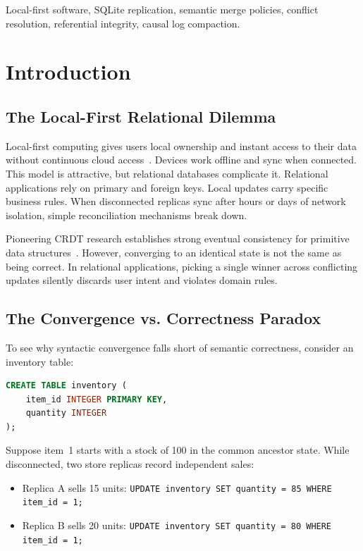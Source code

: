 \documentclass[conference]{IEEEtran}
\begin{document}
\begin{IEEEkeywords}
Local-first software, SQLite replication, semantic merge policies, conflict resolution, referential integrity, causal log compaction.
\end{IEEEkeywords}

\section{Introduction}

\subsection{The Local-First Relational Dilemma}
Local-first computing gives users local ownership and instant access to their data without continuous cloud access~\cite{kleppmann2019localfirst}. Devices work offline and sync when connected. This model is attractive, but relational databases complicate it. Relational applications rely on primary and foreign keys. Local updates carry specific business rules. When disconnected replicas sync after hours or days of network isolation, simple reconciliation mechanisms break down.

Pioneering CRDT research establishes strong eventual consistency for primitive data structures~\cite{shapiro2011crdt, gomes2017verifying}. However, converging to an identical state is not the same as being correct. In relational applications, picking a single winner across conflicting updates silently discards user intent and violates domain rules.

\subsection{The Convergence vs. Correctness Paradox}
To see why syntactic convergence falls short of semantic correctness, consider an inventory table:
\begin{lstlisting}[language=SQL]
CREATE TABLE inventory (
    item_id INTEGER PRIMARY KEY,
    quantity INTEGER
);
\end{lstlisting}
Suppose item~1 starts with a stock of 100 in the common ancestor state. While disconnected, two store replicas record independent sales:
\begin{itemize}
    \item Replica A sells 15 units: \texttt{UPDATE inventory SET quantity = 85 WHERE item\_id = 1;}
    \item Replica B sells 20 units: \texttt{UPDATE inventory SET quantity = 80 WHERE item\_id = 1;}
\end{itemize}
\end{document}
